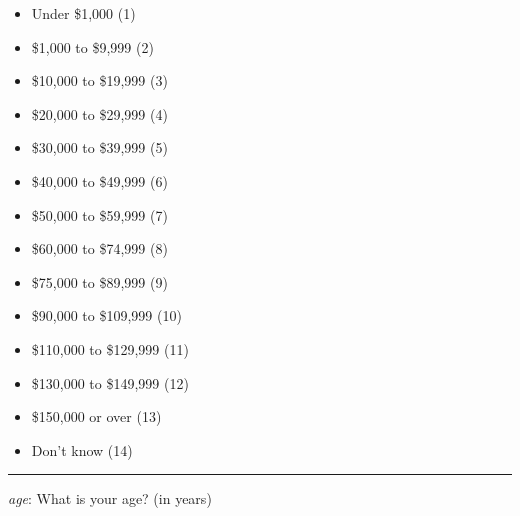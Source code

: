 \begin{itemize}
\tightlist
\item
  Under \$1,000 (1)
\item
  \$1,000 to \$9,999 (2)
\item
  \$10,000 to \$19,999 (3)
\item
  \$20,000 to \$29,999 (4)
\item
  \$30,000 to \$39,999 (5)
\item
  \$40,000 to \$49,999 (6)
\item
  \$50,000 to \$59,999 (7)
\item
  \$60,000 to \$74,999 (8)
\item
  \$75,000 to \$89,999 (9)
\item
  \$90,000 to \$109,999 (10)
\item
  \$110,000 to \$129,999 (11)
\item
  \$130,000 to \$149,999 (12)
\item
  \$150,000 or over (13)
\item
  Don't know (14)
\end{itemize}

\begin{center}\rule{0.5\linewidth}{0.5pt}\end{center}

\emph{age}: What is your age? (in years)